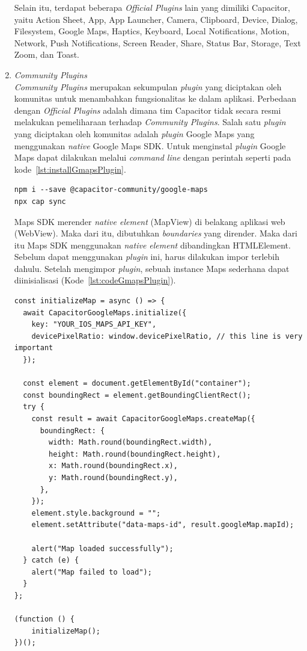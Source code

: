 \begin{enumerate}
\begin{enumerate}
		\end{enumerate}				
		
		Selain itu, terdapat beberapa \textit{Official Plugins} lain yang dimiliki Capacitor, yaitu Action Sheet, App, App Launcher, Camera, Clipboard, Device, Dialog, Filesystem, Google Maps, Haptics, Keyboard, Local Notifications, Motion, Network, Push Notifications, Screen Reader, Share, Status Bar, Storage, Text Zoom, dan Toast.
		
	\item \textit{Community Plugins} \\
		\textit{Community Plugins} merupakan sekumpulan \textit{plugin} yang diciptakan oleh komunitas untuk menambahkan fungsionalitas ke dalam aplikasi. Perbedaan dengan \textit{Official Plugins} adalah dimana tim Capacitor tidak secara resmi melakukan pemeliharaan terhadap \textit{Community Plugins}. Salah satu \textit{plugin} yang diciptakan oleh komunitas adalah \textit{plugin }Google Maps yang menggunakan \textit{native} Google Maps SDK. Untuk menginstal \textit{plugin} Google Maps dapat dilakukan melalui \textit{command line} dengan perintah seperti pada kode~\ref{lst:installGmapsPlugin}.

\newpage		
		
\begin{lstlisting}[label={lst:installGmapsPlugin}, caption=Kode untuk Menginstal \textit{Plugin} Google Maps]
npm i --save @capacitor-community/google-maps
npx cap sync
\end{lstlisting}

	Maps SDK merender \textit{native element} (MapView) di belakang aplikasi web (WebView). Maka dari itu, dibutuhkan \textit{boundaries} yang dirender. Maka dari itu Maps SDK menggunakan \textit{native element} dibandingkan HTMLElement. Sebelum dapat menggunakan \textit{plugin} ini, harus dilakukan impor terlebih dahulu. Setelah mengimpor \textit{plugin}, sebuah instance Maps sederhana dapat diinisialisasi (Kode~\ref{lst:codeGmapsPlugin}).

	
\begin{lstlisting}[label={lst:codeGmapsPlugin}, caption=Contoh Kode Penggunaan \textit{Plugin} Google Maps]
const initializeMap = async () => {
  await CapacitorGoogleMaps.initialize({
    key: "YOUR_IOS_MAPS_API_KEY",
    devicePixelRatio: window.devicePixelRatio, // this line is very important
  });

  const element = document.getElementById("container");
  const boundingRect = element.getBoundingClientRect();
  try {
    const result = await CapacitorGoogleMaps.createMap({
      boundingRect: {
        width: Math.round(boundingRect.width),
        height: Math.round(boundingRect.height),
        x: Math.round(boundingRect.x),
        y: Math.round(boundingRect.y),
      },
    });
    element.style.background = "";
    element.setAttribute("data-maps-id", result.googleMap.mapId);

    alert("Map loaded successfully");
  } catch (e) {
    alert("Map failed to load");
  }
};

(function () {
	initializeMap();
})();
\end{lstlisting}
	
\end{enumerate}


